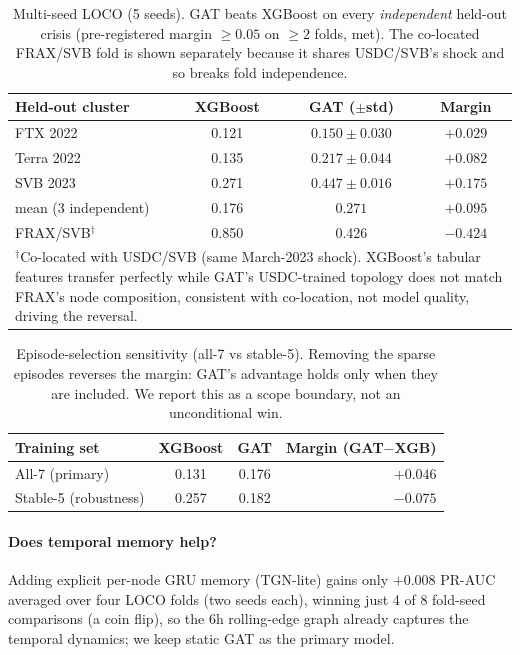 \documentclass[sigconf,anonymous]{acmart}
\begin{document}
\begin{table}[h]
\caption{Multi-seed LOCO (5 seeds). GAT beats XGBoost on every \emph{independent} held-out
crisis (pre-registered margin $\ge 0.05$ on $\ge 2$ folds, met). The co-located FRAX/SVB fold
is shown separately because it shares USDC/SVB's shock and so breaks fold independence.}
\label{tab:loco}
\small
\setlength{\tabcolsep}{5pt}
\begin{tabular}{lccc}
\toprule
Held-out cluster & XGBoost & GAT ($\pm$std) & Margin \\
\midrule
FTX 2022 & 0.121 & $0.150 \pm 0.030$ & $+0.029$ \\
Terra 2022 & 0.135 & $0.217 \pm 0.044$ & $+0.082$ \\
SVB 2023 & 0.271 & $0.447 \pm 0.016$ & $+0.175$ \\
\midrule
mean (3 independent) & 0.176 & $0.271$ & $+0.095$ \\
\midrule
FRAX/SVB$^\dagger$ & 0.850 & 0.426 & $-0.424$ \\
\bottomrule
\multicolumn{4}{p{0.92\columnwidth}}{\footnotesize $^\dagger$Co-located with USDC/SVB (same March-2023 shock). XGBoost's tabular features transfer perfectly while GAT's USDC-trained topology does not match FRAX's node composition, consistent with co-location, not model quality, driving the reversal.}
\end{tabular}
\end{table}

\begin{table}[h]
\caption{Episode-selection sensitivity (all-7 vs stable-5). Removing the sparse episodes reverses the margin: GAT's advantage holds only when they are included. We report this as a scope boundary, not an unconditional win.}
\label{tab:loco_stability}
\small
\setlength{\tabcolsep}{6pt}
\begin{tabular}{lccr}
\toprule
Training set & XGBoost & GAT & Margin (GAT$-$XGB) \\
\midrule
All-7 (primary) & 0.131 & 0.176 & $+0.046$\\
Stable-5 (robustness) & 0.257 & 0.182 & $-0.075$\\
\bottomrule
\end{tabular}
\end{table}

\paragraph{Does temporal memory help?} Adding explicit per-node GRU memory (TGN-lite) gains
only $\mathbf{+0.008}$ PR-AUC averaged over four LOCO folds (two seeds each), winning just 4 of 8
fold-seed comparisons (a coin flip), so the 6h rolling-edge graph already captures the temporal
dynamics; we keep static GAT as the primary model.
\end{document}
